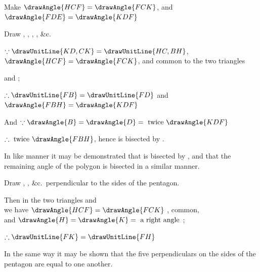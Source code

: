 \documentclass[booklanguage=english]{byrnebook}
\begin{document}
\begin{center}
Make $\drawAngle{HCF} = \drawAngle{FCK}$, and $\drawAngle{FDE} = \drawAngle{KDF}$ 

Draw , , , , \&c.

$\because \drawUnitLine{KD,CK} = \drawUnitLine{HC,BH}$, $\drawAngle{HCF} = \drawAngle{FCK}$, and  common to the two triangles %

and
;

$\therefore \drawUnitLine{FB} = \drawUnitLine{FD}$ and $\drawAngle{FBH} = \drawAngle{KDF}$ 

And $\because \drawAngle{B} = \drawAngle{D} = \mbox{ twice } \drawAngle{KDF}$ %

$\therefore \mbox{ twice } \drawAngle{FBH}$, hence  is bisected by .

In like manner it may be demonstrated that  is bisected by , and that the remaining angle of the polygon is bisected in a similar manner.

Draw , , \&c.\ perpendicular to the sides of the pentagon.

Then in the two triangles
and
\\
we have $\drawAngle{HCF} = \drawAngle{FCK}$ \byref{\constref},  common,\\
and $\drawAngle{H} = \drawAngle{K} = \mbox{ a right angle }$;

$\therefore \drawUnitLine{FK} = \drawUnitLine{FH}$ 
\end{center}

In the same way it may be shown that the five perpendiculars on the sides of the pentagon are equal to one another.
\end{document}
